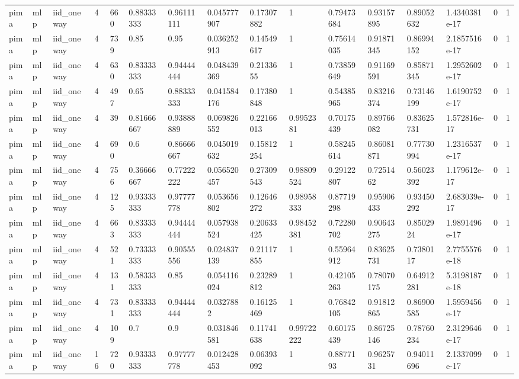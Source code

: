\begin{tabular}{llllllllllllllll}
pima & mlp & iid\_oneway & 4 & 660 & 0.88333333 & 0.96111111 & 0.045777907 & 0.17307882 & 1 & 0.79473684 & 0.93157895 & 0.89052632 & 1.4340381e-17 & 0 & 1 \\
pima & mlp & iid\_oneway & 4 & 739 & 0.85 & 0.95 & 0.036252913 & 0.14549617 & 1 & 0.75614035 & 0.91871345 & 0.86994152 & 2.1857516e-17 & 0 & 1 \\
pima & mlp & iid\_oneway & 4 & 630 & 0.83333333 & 0.94444444 & 0.048439369 & 0.2133655 & 1 & 0.73859649 & 0.91169591 & 0.85871345 & 1.2952602e-17 & 0 & 1 \\
pima & mlp & iid\_oneway & 4 & 497 & 0.65 & 0.88333333 & 0.041584176 & 0.17380848 & 1 & 0.54385965 & 0.83216374 & 0.73146199 & 1.6190752e-17 & 0 & 1 \\
pima & mlp & iid\_oneway & 4 & 39 & 0.81666667 & 0.93888889 & 0.069826552 & 0.22166013 & 0.9952381 & 0.70175439 & 0.89766082 & 0.83625731 & 1.572816e-17 & 0 & 1 \\
pima & mlp & iid\_oneway & 4 & 690 & 0.6 & 0.86666667 & 0.045019632 & 0.15812254 & 1 & 0.58245614 & 0.86081871 & 0.77730994 & 1.2316537e-17 & 0 & 1 \\
pima & mlp & iid\_oneway & 4 & 756 & 0.36666667 & 0.77222222 & 0.056520457 & 0.27309543 & 0.98809524 & 0.29122807 & 0.7251462 & 0.56023392 & 1.179612e-17 & 0 & 1 \\
pima & mlp & iid\_oneway & 4 & 125 & 0.93333333 & 0.97777778 & 0.053656802 & 0.12646272 & 0.98958333 & 0.87719298 & 0.95906433 & 0.93450292 & 2.683039e-17 & 0 & 1 \\
pima & mlp & iid\_oneway & 4 & 663 & 0.83333333 & 0.94444444 & 0.057938524 & 0.20633425 & 0.98452381 & 0.72280702 & 0.90643275 & 0.8502924 & 1.9891496e-17 & 0 & 1 \\
pima & mlp & iid\_oneway & 4 & 521 & 0.73333333 & 0.90555556 & 0.024837139 & 0.21117855 & 1 & 0.55964912 & 0.83625731 & 0.7380117 & 2.7755576e-18 & 0 & 1 \\
pima & mlp & iid\_oneway & 4 & 131 & 0.58333333 & 0.85 & 0.054116024 & 0.23289812 & 1 & 0.42105263 & 0.78070175 & 0.64912281 & 5.3198187e-18 & 0 & 1 \\
pima & mlp & iid\_oneway & 4 & 731 & 0.83333333 & 0.94444444 & 0.0327882 & 0.16125469 & 1 & 0.76842105 & 0.91812865 & 0.86900585 & 1.5959456e-17 & 0 & 1 \\
pima & mlp & iid\_oneway & 4 & 109 & 0.7 & 0.9 & 0.031846581 & 0.11741638 & 0.99722222 & 0.60175439 & 0.86725146 & 0.78760234 & 2.3129646e-17 & 0 & 1 \\
pima & mlp & iid\_oneway & 16 & 720 & 0.93333333 & 0.97777778 & 0.012428453 & 0.06393092 & 1 & 0.8877193 & 0.9625731 & 0.94011696 & 2.1337099e-17 & 0 & 1 \\

\end{tabular}
